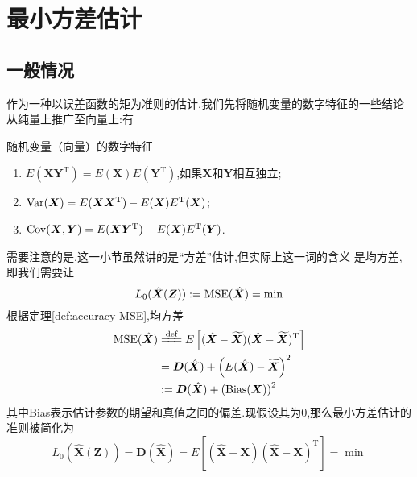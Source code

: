 \documentclass[cn,10pt,citestyle=gb7714-2015,bibstyle=gb7714-2015]{elegantbook}
\newcommand{\mT}{\mathrm{T}}
\newcommand{\MSE}{\textup{MSE}}
\newcommand{\Cov}{\textup{Cov}}
\newcommand{\Var}{\textup{Var}}
\begin{document}
%
\section{最小方差估计}\label{sec:MMSE-estimation}
\subsection{一般情况}
作为一种以误差函数的矩为准则的估计,我们先将随机变量的数字特征的一些结论从纯量上推广至向量上:有
\begin{property}
  随机变量（向量）的数字特征
  \begin{enumerate}
    \item $E(\bm{X}\bm{Y}^\mT)=E(\bm{X})E(\bm{Y}^\mT)$,如果$\bm{X}$和$\bm{Y}$相互独立;
    \item $\Var(\bm{X})=E(\bm{X}\bm{X}^\mT)-E(\bm{X})E^\mT(\bm{X})$;
    \item $\Cov(\bm{X},\bm{Y})=E(\bm{X}\bm{Y}^\mT)-E(\bm{X})E^\mT(\bm{Y})$.
  \end{enumerate}
\end{property}
需要注意的是,这一小节虽然讲的是\colorbox{yellow!20}{“方差”}估计,但实际上这一词的含义
是\colorbox{red!20}{均方差},即我们需要让
\begin{equation}
  L_0(\hat{\bm{X}}(\bm{Z})):=\MSE(\hat{\bm{X}})=\min
\end{equation}
根据定理\ref{def:accuracy-MSE},均方差
\begin{align*}
  \textup{MSE}(\hat{\bm{X}})&\xlongequal{\text{def}}E\left[(\hat{\bm{X}}-\widetilde{\bm{X}})(\hat{\bm{X}}-\widetilde{\bm{X}})^\mT\right]\\
  &=\bm{D}(\hat{\bm{X}})+\left(E(\hat{\bm{X}})-\widetilde{\bm{X}}\right)^2\\
  &:=\bm{D}(\hat{\bm{X}})+\left(\textup{Bias}(\bm{X})\right)^2
\end{align*}
其中Bias表示估计参数的期望和真值之间的偏差.现假设其为0,那么最小方差估计的准则被简化为
\begin{equation}\label{eq:LV-estimation-principle}
  L_0(\hat{\bm{X}}(\bm{Z}))=\bm{D}(\hat{\bm{X}})=E[(\hat{\bm{X}}-\bm{X})(\hat{\bm{X}}-\bm{X})^\mT]=\min
\end{equation}
\end{document}

